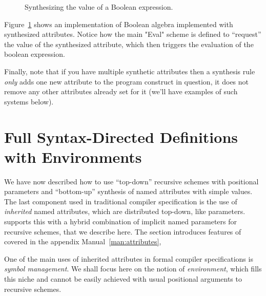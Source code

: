 \documentclass[11pt]{article} %
\begin{document}
\begin{figure}[p]
  \caption{Synthesizing the value of a Boolean expression.}
  \label{fig:bool}
\end{figure}

\begin{example}\label{ex:bool}
  Figure~\ref{fig:bool} shows an implementation of Boolean algebra implemented with synthesized
  attributes. Notice how the main "Eval" scheme is defined to ``request'' the value of the
  synthesized attribute, which then triggers the evaluation of the boolean expression.
\end{example}

Finally, note that if you have multiple synthetic attributes then a synthesis rule \emph{only} adds
one new attribute to the program construct in question, it does not remove any other attributes
already set for it (we'll have examples of such systems below).


\section{Full Syntax-Directed Definitions with Environments}
\label{sec:sdd}

We have now described how to use ``top-down'' recursive schemes with positional parameters and
``bottom-up'' synthesis of named attributes with simple values. The last component used in
traditional compiler specification is the use of \emph{inherited} named attributes, which are
distributed top-down, like parameters. \HAX supports this with a hybrid combination of implicit
named parameters for recursive schemes, that we describe here. The section introduces features of
\HAX covered in the appendix Manual~\ref{man:attributes},

One of the main uses of inherited attributes in formal compiler specifications is \emph{symbol
  management}. We shall focus here on the \HAX notion of \emph{environment}, which fills this niche
and cannot be easily achieved with usual positional arguments to recursive schemes.
\end{document}
